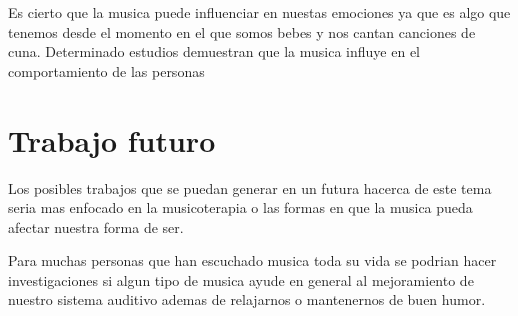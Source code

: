 \documentclass{bmcart}
\begin{document}
Es cierto que la musica puede influenciar en nuestas emociones ya que es algo que tenemos desde el momento en el que somos bebes y nos cantan canciones de cuna.
Determinado estudios demuestran que la musica influye en el comportamiento de las personas 
\section*{Trabajo futuro}
Los posibles trabajos que se puedan generar en un futura hacerca de este tema seria mas enfocado en la musicoterapia o las formas en que la musica pueda afectar nuestra forma de ser.

Para muchas personas que han escuchado musica toda su vida se podrian hacer investigaciones si algun tipo de musica ayude en general al mejoramiento de nuestro sistema auditivo ademas de relajarnos o mantenernos de buen humor.

\end{document}
